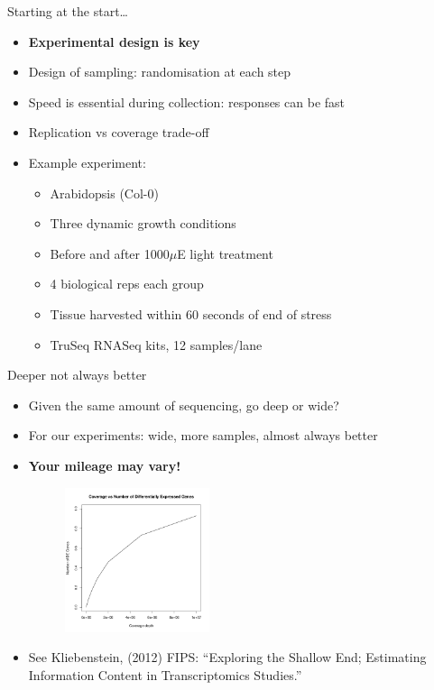 \documentclass[t]{beamer}
\begin{document}
\begin{frame}{Starting at the start\ldots}
  \begin{itemize}
    \item \textbf{Experimental design is key}
    \pause
    \item Design of sampling: randomisation at each step
    \pause
    \item Speed is essential during collection: responses can be fast
    \pause
    \item Replication vs coverage trade-off
    \pause
    \item Example experiment:
    \begin{itemize}
      \item Arabidopsis (Col-0)
      \item Three dynamic growth conditions
      \item Before and after 1000$\mu$E light treatment
      \item 4 biological reps each group
      \item Tissue harvested within 60 seconds of end of stress
      \item TruSeq RNASeq kits, 12 samples/lane
    \end{itemize}
  \end{itemize}
\end{frame}

\begin{frame}{Deeper not always better}
  \begin{itemize}
    \item Given the same amount of sequencing, go deep or wide?
    \pause
    \item For our experiments: wide, more samples, almost always better
    \item \textbf{Your mileage may vary!}
    \pause
    \begin{figure}[h]
      \begin{center}
        \includegraphics[width=0.4\textwidth]{./img/coverage.png}
      \end{center}
    \end{figure}
    \pause
    \item \tiny{See Kliebenstein, (2012) FIPS: “Exploring the Shallow End;
                Estimating Information Content in Transcriptomics Studies.”}
  \end{itemize}
\end{frame}
\end{document}

